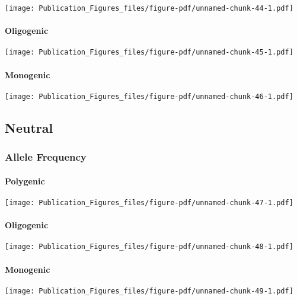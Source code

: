 \documentclass[
  letterpaper,
  DIV=11,
  numbers=noendperiod]{scrartcl}
\begin{document}
\texttt{[image: Publication\_Figures\_files/figure-pdf/unnamed-chunk-44-1.pdf]}

\hypertarget{oligogenic-4}{%
\paragraph{Oligogenic}\label{oligogenic-4}}

\texttt{[image: Publication\_Figures\_files/figure-pdf/unnamed-chunk-45-1.pdf]}

\hypertarget{monogenic-4}{%
\paragraph{Monogenic}\label{monogenic-4}}

\texttt{[image: Publication\_Figures\_files/figure-pdf/unnamed-chunk-46-1.pdf]}

\hypertarget{neutral}{%
\subsection{Neutral}\label{neutral}}

\hypertarget{allele-frequency-3}{%
\subsubsection{Allele Frequency}\label{allele-frequency-3}}

\hypertarget{polygenic-5}{%
\paragraph{Polygenic}\label{polygenic-5}}

\texttt{[image: Publication\_Figures\_files/figure-pdf/unnamed-chunk-47-1.pdf]}

\hypertarget{oligogenic-5}{%
\paragraph{Oligogenic}\label{oligogenic-5}}

\texttt{[image: Publication\_Figures\_files/figure-pdf/unnamed-chunk-48-1.pdf]}

\hypertarget{monogenic-5}{%
\paragraph{Monogenic}\label{monogenic-5}}

\texttt{[image: Publication\_Figures\_files/figure-pdf/unnamed-chunk-49-1.pdf]}
\end{document}
